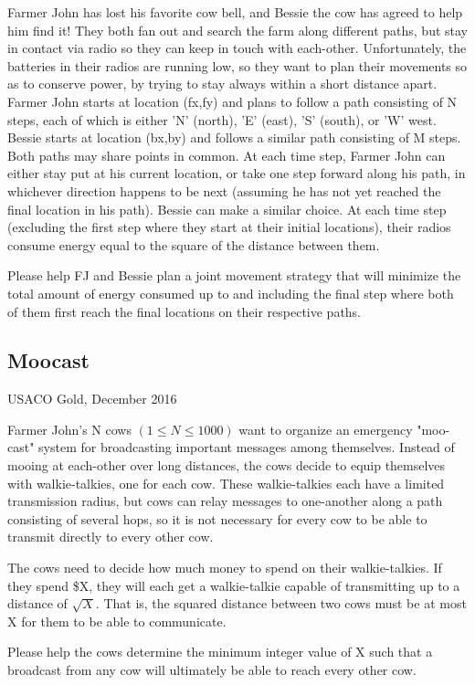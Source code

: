 \documentclass[11pt]{article}
\begin{document}
Farmer John has lost his favorite cow bell, and Bessie the cow has agreed to help him find it! They both fan out and search the farm along different paths, but stay in contact via radio so they can keep in touch with each-other. Unfortunately, the batteries in their radios are running low, so they want to plan their movements so as to conserve power, by trying to stay always within a short distance apart.
Farmer John starts at location (fx,fy) and plans to follow a path consisting of N steps, each of which is either 'N' (north), 'E' (east), 'S' (south), or 'W' west. Bessie starts at location (bx,by) and follows a similar path consisting of M steps. Both paths may share points in common. At each time step, Farmer John can either stay put at his current location, or take one step forward along his path, in whichever direction happens to be next (assuming he has not yet reached the final location in his path). Bessie can make a similar choice. At each time step (excluding the first step where they start at their initial locations), their radios consume energy equal to the square of the distance between them.

Please help FJ and Bessie plan a joint movement strategy that will minimize the total amount of energy consumed up to and including the final step where both of them first reach the final locations on their respective paths.

\subsection{Moocast}
USACO Gold, December 2016

Farmer John's N cows $(1\leq N\leq 1000)$ want to organize an emergency "moo-cast" system for broadcasting important messages among themselves.
Instead of mooing at each-other over long distances, the cows decide to equip themselves with walkie-talkies, one for each cow. These walkie-talkies each have a limited transmission radius, but cows can relay messages to one-another along a path consisting of several hops, so it is not necessary for every cow to be able to transmit directly to every other cow.

The cows need to decide how much money to spend on their walkie-talkies. If they spend \$X, they will each get a walkie-talkie capable of transmitting up to a distance of $\sqrt{X}$. That is, the squared distance between two cows must be at most X for them to be able to communicate.

Please help the cows determine the minimum integer value of X such that a broadcast from any cow will ultimately be able to reach every other cow.
\end{document}
